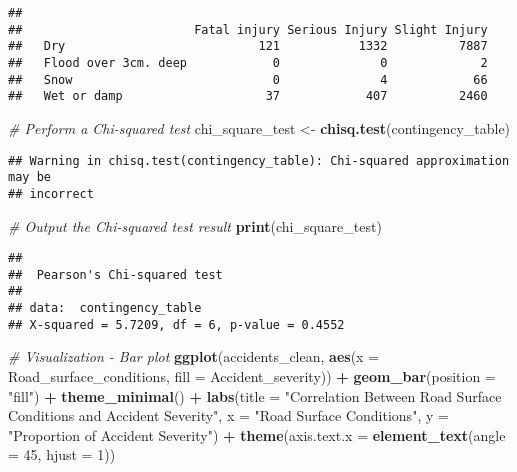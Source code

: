\documentclass[
]{article}
\newenvironment{Shaded}{\begin{snugshade}}{\end{snugshade}}
\newcommand{\AttributeTok}[1]{\textcolor[rgb]{0.13,0.29,0.53}{#1}}
\newcommand{\CommentTok}[1]{\textcolor[rgb]{0.56,0.35,0.01}{\textit{#1}}}
\newcommand{\DecValTok}[1]{\textcolor[rgb]{0.00,0.00,0.81}{#1}}
\newcommand{\FunctionTok}[1]{\textcolor[rgb]{0.13,0.29,0.53}{\textbf{#1}}}
\newcommand{\NormalTok}[1]{#1}
\newcommand{\OtherTok}[1]{\textcolor[rgb]{0.56,0.35,0.01}{#1}}
\newcommand{\SpecialCharTok}[1]{\textcolor[rgb]{0.81,0.36,0.00}{\textbf{#1}}}
\newcommand{\StringTok}[1]{\textcolor[rgb]{0.31,0.60,0.02}{#1}}
\begin{document}
\begin{verbatim}
##                       
##                        Fatal injury Serious Injury Slight Injury
##   Dry                           121           1332          7887
##   Flood over 3cm. deep            0              0             2
##   Snow                            0              4            66
##   Wet or damp                    37            407          2460
\end{verbatim}

\begin{Shaded}
\begin{Highlighting}[]
\CommentTok{\# Perform a Chi{-}squared test}
\NormalTok{chi\_square\_test }\OtherTok{\textless{}{-}} \FunctionTok{chisq.test}\NormalTok{(contingency\_table)}
\end{Highlighting}
\end{Shaded}

\begin{verbatim}
## Warning in chisq.test(contingency_table): Chi-squared approximation may be
## incorrect
\end{verbatim}

\begin{Shaded}
\begin{Highlighting}[]
\CommentTok{\# Output the Chi{-}squared test result}
\FunctionTok{print}\NormalTok{(chi\_square\_test)}
\end{Highlighting}
\end{Shaded}

\begin{verbatim}
## 
##  Pearson's Chi-squared test
## 
## data:  contingency_table
## X-squared = 5.7209, df = 6, p-value = 0.4552
\end{verbatim}

\begin{Shaded}
\begin{Highlighting}[]
\CommentTok{\# Visualization {-} Bar plot}
\FunctionTok{ggplot}\NormalTok{(accidents\_clean, }\FunctionTok{aes}\NormalTok{(}\AttributeTok{x =}\NormalTok{ Road\_surface\_conditions, }\AttributeTok{fill =}\NormalTok{ Accident\_severity)) }\SpecialCharTok{+}
  \FunctionTok{geom\_bar}\NormalTok{(}\AttributeTok{position =} \StringTok{"fill"}\NormalTok{) }\SpecialCharTok{+}
  \FunctionTok{theme\_minimal}\NormalTok{() }\SpecialCharTok{+}
  \FunctionTok{labs}\NormalTok{(}\AttributeTok{title =} \StringTok{"Correlation Between Road Surface Conditions and Accident Severity"}\NormalTok{,}
       \AttributeTok{x =} \StringTok{"Road Surface Conditions"}\NormalTok{, }\AttributeTok{y =} \StringTok{"Proportion of Accident Severity"}\NormalTok{) }\SpecialCharTok{+}
  \FunctionTok{theme}\NormalTok{(}\AttributeTok{axis.text.x =} \FunctionTok{element\_text}\NormalTok{(}\AttributeTok{angle =} \DecValTok{45}\NormalTok{, }\AttributeTok{hjust =} \DecValTok{1}\NormalTok{))}
\end{Highlighting}
\end{Shaded}
\end{document}
